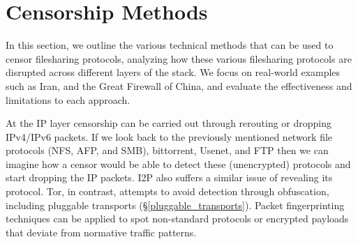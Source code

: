 




\section{Censorship Methods}\label{censorship}

In this section, we outline the various technical methods that can be used to
censor filesharing protocols, analyzing how these various filesharing protocols
are disrupted across different layers of the stack. We focus on real-world
examples such as Iran, and the Great Firewall of China, and evaluate the
effectiveness and limitations to each approach.

At the IP layer censorship can be carried out through rerouting or dropping IPv4/IPv6 packets.
\cite{wendzelSurveyInternetCensorship2025} If we look back to the previously
mentioned network file protocols (NFS, AFP, and SMB), bittorrent, Usenet, and
FTP then we can imagine how a censor would be able to detect these (unencrypted)
protocols and start dropping the IP packets. I2P also suffers a similar issue of
revealing its protocol.  Tor, in contrast, attempts to avoid detection through obfuscation,
including pluggable transports (\S \ref{pluggable_transports}). Packet fingerprinting techniques
can be applied to spot non-standard protocols or encrypted payloads that deviate from normative
traffic patterns.

